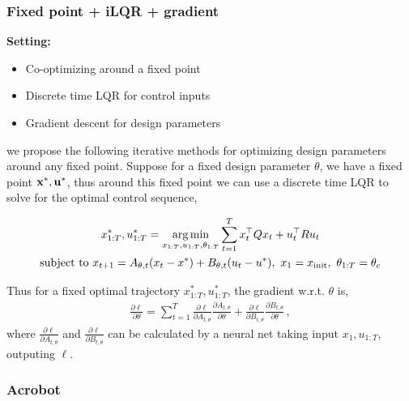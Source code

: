 \documentclass[conference]{IEEEtran}
\begin{document}
\subsubsection{Fixed point + iLQR + gradient}



\textbf{Setting:}
\vspace{-5pt}
\begin{itemize}
    \setlength{\itemsep}{0pt}
    \setlength{\parsep}{0pt}
    \setlength{\parskip}{0pt}
    \item Co-optimizing around a fixed point
    \item Discrete time LQR for control inputs
    \item Gradient descent for design parameters
\end{itemize}


we propose the following iterative methods for optimizing design parameters around any fixed point. Suppose for a fixed design parameter $\theta$, we have a fixed point $\mathbf{x}^*, \mathbf{u}^*$, thus around this fixed point we can use a discrete time LQR to solve for the optimal control sequence,

\begin{gather*}
    x_{1:T}^*, u_{1:T}^*= \operatorname*{arg\,min}\limits_{x_{1:T},u_{1:T},\theta_{1:T}} \sum\limits_{t=1}^{T} x_t^\top Q x_t + u_t^\top R u_t \\
    \text{subject to~} x_{t+1} = A_{\theta,t}(x_t - x^*) + B_{\theta,t}(u_t-u^*) ,~x_1 = x_{\text{init}},~\theta_{1:T} = \theta_c
\end{gather*}


Thus for a fixed optimal trajectory $x_{1:T}^*, u_{1:T}^*$, the gradient w.r.t. $\theta$ is,
\begin{align*}
\frac{\partial \ell}{\partial \theta} = \sum\limits_{t=1}^{T} \frac{\partial \ell}{\partial A_{t,\theta}} \frac{\partial A_{t,\theta}}{\partial \theta}  + \frac{\partial \ell}{\partial B_{t,\theta}} \frac{\partial B_{t,\theta}}{\partial \theta}\,, 
\end{align*}
where $ \frac{\partial \ell}{\partial A_{t,\theta}}$ and $\frac{\partial \ell}{\partial B_{t,\theta}} $ can be calculated by a neural net taking input $x_1, u_{1:T}$, outputing $\ell$.




\subsubsection{Acrobot}
\end{document}
